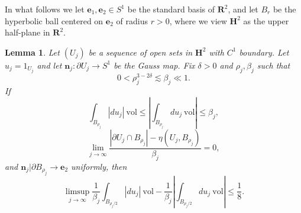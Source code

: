 \documentclass[reqno,12pt,letterpaper]{amsart}
\newcommand{\RR}{\mathbf{R}}
\newcommand{\Hyp}{\mathbf H}
\newcommand{\evect}{\mathbf e}
\newcommand{\normal}{\mathbf n}
\newcommand{\vol}{\mathrm{vol}}
\newtheorem{lemma}[theorem]{Lemma}
\theoremstyle{definition}
\numberwithin{equation}{section}
\begin{document}
In what follows we let $\evect_1, \evect_2 \in S^1$ be the standard basis of $\RR^2$, and let $B_r$ be the hyperbolic ball centered on $\evect_2$ of radius $r > 0$, where we view $\Hyp^2$ as the upper half-plane in $\RR^2$.

\begin{lemma}
Let $(U_j)$ be a sequence of open sets in $\Hyp^2$ with $C^1$ boundary.
Let $u_j = 1_{U_j}$ and let $\normal_j: \partial U_j \to S^1$ be the Gauss map.
Fix $\delta > 0$ and $\rho_j, \beta_j$ such that
$$0 < \rho_j^{3 - 2\delta} \lesssim \beta_j \ll 1.$$
If
$$\int_{B_{\rho_j}} |du_j| ~\vol \leq \left|\int_{B_{\rho_j}} du_j ~\vol\right| \leq \beta_j,$$
$$\lim_{j \to \infty} \frac{|\partial U_j \cap B_{\rho_j}| - \eta(U_j, B_{\rho_j})}{\beta_j} = 0,$$
and $\normal_j|\partial B_{\rho_j} \to \evect_2$ uniformly,
then
$$\limsup_{j \to \infty} \frac{1}{\beta_j} \int_{B_{\rho_j/2}} |du_j| ~\vol - \frac{1}{\beta_j}\left|\int_{B_{\rho_j/2}} du_j ~\vol\right| \leq \frac{1}{8}.$$
\end{lemma}
\end{document}
